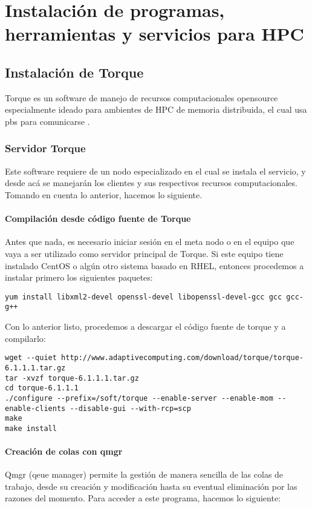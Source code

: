 \chapter{Instalación de programas, herramientas y servicios para HPC}



\section{Instalación de Torque}
Torque es un software de manejo de recursos computacionales opensource especialmente ideado para ambientes de HPC de memoria distribuida, el cual usa pbs para comunicarse \cite{torque}. 

\subsection{Servidor Torque}
Este software requiere de un nodo especializado en el cual se instala el servicio, y desde acá se manejarán los clientes y sus respectivos recursos computacionales. Tomando en cuenta lo anterior, hacemos lo siguiente.

\subsubsection{Compilación desde código fuente de Torque}
Antes que nada, es necesario iniciar sesión en el meta nodo o en el equipo que vaya a ser utilizado como servidor principal de Torque. Si este equipo tiene instalado CentOS o algún otro sistema basado en RHEL, entonces procedemos a instalar primero los siguientes paquetes:

\begin{lstlisting}
yum install libxml2-devel openssl-devel libopenssl-devel-gcc gcc gcc-g++
\end{lstlisting}

Con lo anterior listo, procedemos a descargar el código fuente de torque y a compilarlo:

\begin{lstlisting}
wget --quiet http://www.adaptivecomputing.com/download/torque/torque-6.1.1.1.tar.gz
tar -xvzf torque-6.1.1.1.tar.gz
cd torque-6.1.1.1
./configure --prefix=/soft/torque --enable-server --enable-mom --enable-clients --disable-gui --with-rcp=scp
make
make install
\end{lstlisting}


\subsubsection{Creación de colas con qmgr}
Qmgr (qeue manager) permite la gestión de manera sencilla de las colas de trabajo, desde su creación y modificación hasta su eventual eliminación por las razones del momento. Para acceder a este programa, hacemos lo siguiente:

